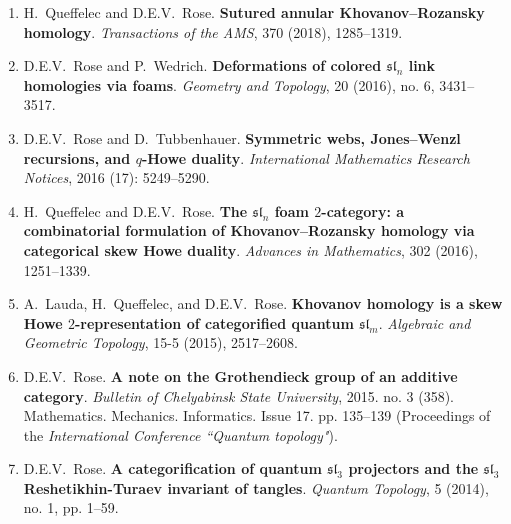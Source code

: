\documentclass[10pt]{article}
\begin{document}
\begin{enumerate}
\item 
H.~Queffelec and D.E.V.~Rose.
{\bf Sutured annular Khovanov--Rozansky homology}.
\emph{Transactions of the AMS}, 370 (2018), 1285--1319. %

\item 
D.E.V.~Rose and P.~Wedrich.
{\bf Deformations of colored $\mathfrak{sl}_n$ link homologies via foams}.
\emph{Geometry and Topology}, 20 (2016), no. 6, 3431--3517. %

\item 
D.E.V.~Rose and D.~Tubbenhauer.
{\bf Symmetric webs, Jones--Wenzl recursions, and $q$-Howe duality}.
\emph{International Mathematics Research Notices}, 2016 (17): 5249--5290. %

\item 
H.~Queffelec and D.E.V.~Rose.
{\bf The $\mathfrak{sl}_n$ foam $2$-category: a combinatorial formulation of Khovanov--Rozansky
homology via categorical skew Howe duality}.
\emph{Advances in Mathematics}, 302 (2016), 1251--1339. %

\item 
A.~Lauda, H.~Queffelec\textsuperscript{\textdagger}, and D.E.V.~Rose.
{\bf Khovanov homology is a skew Howe $2$-representation of categorified quantum $\mathfrak{sl}_m$}.
\emph{Algebraic and Geometric Topology}, 15-5 (2015), 2517--2608. %

\item 
D.E.V.~Rose.
{\bf A note on the Grothendieck group of an additive category}.
\emph{Bulletin of Chelyabinsk State University}, 2015. no. 3 (358). 
Mathematics. Mechanics. Informatics. Issue 17. pp. 135--139 %
(Proceedings of the {\it International Conference ``Quantum topology"}).
 
\item 
D.E.V.~Rose.
{\bf A categorification of quantum $\mathfrak{sl}_3$ projectors and the $\mathfrak{sl}_3$ 
Reshetikhin-Turaev invariant of tangles}.
\emph{Quantum Topology}, 5 (2014), no. 1, pp. 1--59. %
 

\end{enumerate}
\end{document}
